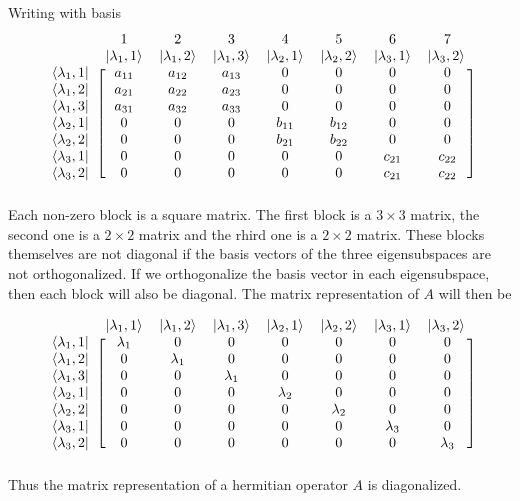 	Writing with basis
	\begin{equation}
	\begin{blockarray}{cccccccc}
	\ & 1 & 2 & 3 & 4 & 5 & 6 & 7 \\
	\ & \ket{\lambda_1, 1} & \ket{\lambda_1, 2} & \ket{\lambda_1, 3} & \ket{\lambda_2, 1} & \ket{\lambda_2, 2} & \ket{\lambda_3, 1} & \ket{\lambda_3, 2} \\
		\begin{block}{c[ccccccc]}
		\bra{\lambda_1, 1} & a_{11} & a_{12} & a_{13} & 0 & 0 & 0 & 0 \\
		\bra{\lambda_1, 2} & a_{21} & a_{22} & a_{23} & 0 & 0 & 0 & 0 \\
		\bra{\lambda_1, 3} & a_{31} & a_{32} & a_{33} & 0 & 0 & 0 & 0 \\ 
		\bra{\lambda_2, 1} & 0 & 0 & 0 & b_{11} & b_{12} & 0 & 0 \\
		\bra{\lambda_2, 2} & 0 & 0 & 0 & b_{21} & b_{22} & 0 & 0 \\ 
		\bra{\lambda_3, 1} & 0 & 0 & 0 & 0 & 0 & c_{21} & c_{22}\\
		\bra{\lambda_3, 2} & 0 & 0 & 0 & 0 & 0 & c_{21} & c_{22}  \\ 
		\end{block}
	\end{blockarray}
	\end{equation}
	Each non-zero block is a square matrix. The first block is a $3\times 3$ matrix, the second one is a $2\times 2$ matrix and the rhird one is a $2\times 2$ matrix. These blocks themselves are not diagonal if the basis vectors of the three eigensubspaces are not orthogonalized. If we orthogonalize the basis vector in each eigensubspace, then each block will also be diagonal. The matrix representation of $A$ will then be
	
	\begin{equation}
	\begin{blockarray}{cccccccc}
	\ & \ket{\lambda_1, 1} & \ket{\lambda_1, 2} & \ket{\lambda_1, 3} & \ket{\lambda_2, 1} & \ket{\lambda_2, 2} & \ket{\lambda_3, 1} & \ket{\lambda_3, 2} \\
	\begin{block}{c[ccccccc]}
	\bra{\lambda_1, 1} & \lambda_1 & 0 & 0 & 0 & 0 & 0 & 0 \\
	\bra{\lambda_1, 2} & 0 & \lambda_1 & 0 & 0 & 0 & 0 & 0 \\
	\bra{\lambda_1, 3} & 0 & 0 & \lambda_1 & 0 & 0 & 0 & 0 \\ 
	\bra{\lambda_2, 1} & 0 & 0 & 0 & \lambda_2 & 0 & 0 & 0 \\
	\bra{\lambda_2, 2} & 0 & 0 & 0 & 0 & \lambda_2 & 0 & 0 \\ 
	\bra{\lambda_3, 1} & 0 & 0 & 0 & 0 & 0 & \lambda_3 & 0\\
	\bra{\lambda_3, 2} & 0 & 0 & 0 & 0 & 0 & 0 & \lambda_3  \\ 
	\end{block}
	\end{blockarray}
	\end{equation}
	Thus the matrix representation of a hermitian operator $A$ is diagonalized.
	
